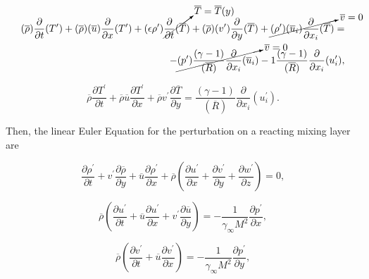 \begin{equation*}
\begin{split}
(\overline{\rho})
\frac{\partial  }{\partial  t}
( T^{\prime})
+
(\overline{\rho})
(\overline{u}) 
\frac{\partial }{\partial x} 
(T^{\prime})
+
(\epsilon \rho^{\prime})
\cancelto{\overline{T}=\overline{T}(y)}{
\frac{\partial  }{\partial  t}
(\overline{T})
}
+
(\overline{\rho})
( v^{\prime}) 
\frac{\partial }{\partial y} 
(\overline{T})
+
\cancelto{\overline{v}=0}{
( \rho^{\prime})
(\overline{u}_i) 
\frac{\partial }{\partial x_i} 
(\overline{T})
}
= 
\\
-
\cancelto{\overline{v}=0}{
( p^{\prime})
\frac{(\gamma-1)}{
(\overline{R})
}
\frac{\partial}{\partial x_i} 
(\overline{u}_i) 
}
-
1
\frac{(\gamma-1)}{
(\overline{R})
}
\frac{\partial}{\partial x_i} 
( u^\prime_i) 
,
\end{split}
\end{equation*} 

\begin{equation}
\overline{\rho}
\frac{\partial T^{\prime} }{\partial  t}
+
\overline{\rho}
\overline{u}
\frac{\partial T^{\prime}}{\partial x}
+
\overline{\rho}
v^{\prime}
\frac{\partial \overline{T} }{\partial y} 
= 
\frac{(\gamma-1)}{(\overline{R})}
\frac{\partial}{\partial x_i} 
(u^\prime_i) 
.
\end{equation} 

Then, the linear Euler Equation for the perturbation on a reacting mixing layer are 

\begin{equation} 
\frac{\partial\rho^{\prime}}{\partial t}
+
v^{\prime}
\frac{\partial \overline{\rho}}{\partial y} 
+
\overline{u}
\frac{\partial \rho^{\prime}}{\partial x} 
+
\overline{\rho}
\left(
\frac{\partial u^\prime}{\partial x}
+
\frac{\partial v^\prime}{\partial y}
+
\frac{\partial w^\prime}{\partial z}
\right)
=
0
,
\end{equation} 

\begin{equation} 
\overline{\rho}
\left(
\frac{\partial u^{\prime}}{\partial t}
+
\overline{u}
\frac{\partial u^{\prime}}{\partial x}
+
v^{\prime}
\frac{\partial\overline{u}}{\partial y}
\right)
=
-
\frac{1}{\gamma_{\infty} M^{2}}
\frac{\partial p^{\prime} }{\partial x} 
,
\end{equation} 

\begin{equation} 
\overline{\rho}
\left(
\frac{\partial v^{\prime}}{\partial t}
+
\overline{u}
\frac{\partial v^{\prime}}{\partial x}
\right)
=
-
\frac{1}{\gamma_{\infty} M^{2}}
\frac{\partial p^{\prime} }{\partial y} 
,
\end{equation} 


